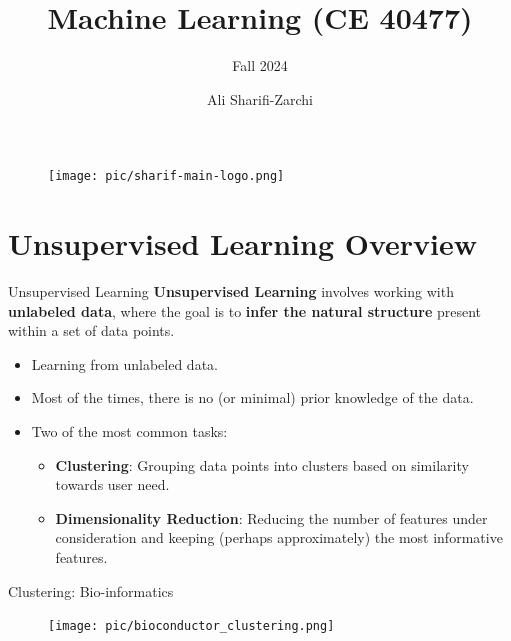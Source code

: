 \documentclass[serif, aspectratio=169]{beamer}
\author{Ali Sharifi-Zarchi}
\title{Machine Learning (CE 40477)}
\subtitle{Fall 2024}
\institute{
    CE Department \\
    Sharif University of Technology
}
\begin{document}
\begin{frame}
    \titlepage
    \vspace*{-0.6cm}
    \begin{figure}[htpb]
        \begin{center}
            \texttt{[image: pic/sharif-main-logo.png]}
        \end{center}
    \end{figure}
\end{frame}

\begin{frame}    
\tableofcontents[sectionstyle=show,
subsectionstyle=show/shaded/hide,
subsubsectionstyle=show/shaded/hide]
\end{frame}

\section{Unsupervised Learning Overview}
\begin{frame}{Unsupervised Learning}
    \textbf{Unsupervised Learning} involves working with \textbf{unlabeled data}, where the goal is to \textbf{infer the natural structure} present within a set of data points.
    \begin{itemize}
        \item Learning from unlabeled data.
        \item Most of the times, there is no (or minimal) prior knowledge of the data.
        \item Two of the most common tasks:
        \begin{itemize}
            \item \textbf{Clustering}: Grouping data points into clusters based on similarity towards user need.
            \item \textbf{Dimensionality Reduction}: Reducing the number of features under consideration and keeping (perhaps approximately) the most informative features.
        \end{itemize}
    \end{itemize}
\end{frame}

\begin{frame}{Clustering: Bio-informatics}
    \begin{figure}
        \centering
        \texttt{[image: pic/bioconductor\_clustering.png]}
    \end{figure}
\end{frame}
\end{document}
